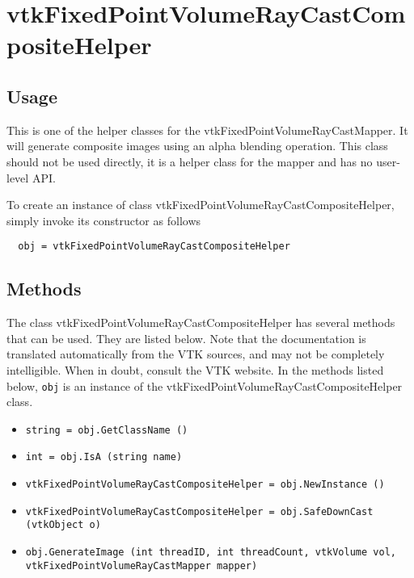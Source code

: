 \section{vtkFixedPointVolumeRayCastCompositeHelper}

\subsection{Usage}

 This is one of the helper classes for the vtkFixedPointVolumeRayCastMapper. 
 It will generate composite images using an alpha blending operation. 
 This class should not be used directly, it is a helper class for
 the mapper and has no user-level API.


To create an instance of class vtkFixedPointVolumeRayCastCompositeHelper, simply
invoke its constructor as follows
\begin{verbatim}
  obj = vtkFixedPointVolumeRayCastCompositeHelper
\end{verbatim}
\subsection{Methods}

The class vtkFixedPointVolumeRayCastCompositeHelper has several methods that can be used.
  They are listed below.
Note that the documentation is translated automatically from the VTK sources,
and may not be completely intelligible.  When in doubt, consult the VTK website.
In the methods listed below, \verb|obj| is an instance of the vtkFixedPointVolumeRayCastCompositeHelper class.
\begin{itemize}
\item  \verb|string = obj.GetClassName ()|

\item  \verb|int = obj.IsA (string name)|

\item  \verb|vtkFixedPointVolumeRayCastCompositeHelper = obj.NewInstance ()|

\item  \verb|vtkFixedPointVolumeRayCastCompositeHelper = obj.SafeDownCast (vtkObject o)|

\item  \verb|obj.GenerateImage (int threadID, int threadCount, vtkVolume vol, vtkFixedPointVolumeRayCastMapper mapper)|

\end{itemize}
